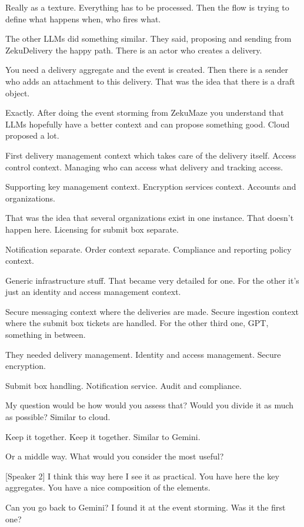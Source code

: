 Really as a texture. Everything has to be processed. Then the flow is trying to define what happens when, who fires what.

The other LLMs did something similar. They said, proposing and sending from ZekuDelivery the happy path. There is an actor who creates a delivery.

You need a delivery aggregate and the event is created. Then there is a sender who adds an attachment to this delivery. That was the idea that there is a draft object.

Exactly. After doing the event storming from ZekuMaze you understand that LLMs hopefully have a better context and can propose something good. Cloud proposed a lot.

First delivery management context which takes care of the delivery itself. Access control context. Managing who can access what delivery and tracking access.

Supporting key management context. Encryption services context. Accounts and organizations.

That was the idea that several organizations exist in one instance. That doesn't happen here. Licensing for submit box separate.

Notification separate. Order context separate. Compliance and reporting policy context.

Generic infrastructure stuff. That became very detailed for one. For the other it's just an identity and access management context.

Secure messaging context where the deliveries are made. Secure ingestion context where the submit box tickets are handled. For the other third one, GPT, something in between.

They needed delivery management. Identity and access management. Secure encryption.

Submit box handling. Notification service. Audit and compliance.

My question would be how would you assess that? Would you divide it as much as possible? Similar to cloud.

Keep it together. Keep it together. Similar to Gemini.

Or a middle way. What would you consider the most useful?

[Speaker 2]
I think this way here I see it as practical. You have here the key aggregates. You have a nice composition of the elements.

Can you go back to Gemini? I found it at the event storming. Was it the first one?

